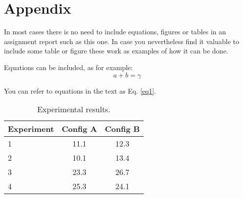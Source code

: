 \documentclass[conference]{IEEEtran}
\begin{document}
\section*{Appendix}
In most cases there is no need to include equations, figures or tables in an assignment report such as this one. In case you nevertheless find it valuable to include some table or figure these work as examples of how it can be done.

Equations can be included, as for example:
\begin{equation}
a+b=\gamma\label{eq1}
\end{equation}

You can refer to equations in the text as Eq. \eqref{eq1}.



\begin{table}[b]
  \begin{center}
    \caption{Experimental results.}
    \label{tab:table1}
    \begin{tabular}{l|c|c}
      \textbf{Experiment} & \textbf{Config A} & \textbf{Config B}\\
      \hline
      1 & 11.1 & 12.3\\
      2 & 10.1 & 13.4\\
      3 & 23.3 & 26.7\\
      4 & 25.3 & 24.1\\
    \end{tabular}
  \end{center}
\end{table}
\end{document}

